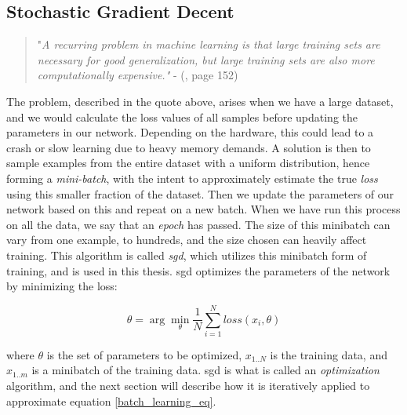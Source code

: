 \subsection{Stochastic Gradient Decent} \label{batch learning}
        \begin{quote}
        "\textit{A recurring problem in machine learning is that large training sets are necessary for good generalization, but large training sets are also more computationally
        expensive."} - (\citeauthor{Goodfellow-et-al-2016_SGD}\citeyear{Goodfellow-et-al-2016_SGD}, page 152)
    \end{quote}
    
    The problem, described in the quote above, arises when we have a large dataset, and we would calculate the loss values of all samples before updating the parameters in our network\cite{Goodfellow-et-al-2016_SGD}. Depending on the hardware, this could lead to a crash or slow learning due to heavy memory demands. A solution is then to sample examples from the entire dataset with a uniform distribution, hence forming a \textit{mini-batch}, with the intent to approximately estimate the true \textit{loss} using this smaller fraction of the dataset. Then we update the parameters of our network based on this and repeat on a new batch. When we have run this process on all the data, we say that an \textit{epoch} has passed. The size of this minibatch can vary from one example, to hundreds, and the size chosen can heavily affect training\cite{wilson2001need_learning_rate}. This algorithm is called \textit{\gls{sgd}}\cite{Goodfellow-et-al-2016_SGD}, which utilizes this minibatch form of training, and is used in this thesis. \gls{sgd} optimizes the parameters of the network by minimizing the loss\cite{pmlr-v37-ioffe15_batch_norm}:
    
        \begin{equation} \label{batch_learning_eq}
            \theta = \arg \min_{\theta}\dfrac{1}{N} \sum^{N}_{i=1} loss (x_{i},\theta)
        \end{equation}
    
    where $\theta$ is the set of parameters to be optimized, $x_{1..N}$ is the training data, and $x_{1..m}$ is a minibatch of the training data. \gls{sgd} is what is called an \textit{optimization} algorithm, and the next section will describe how it is iteratively applied to approximate equation \ref{batch_learning_eq}. 
    
    
